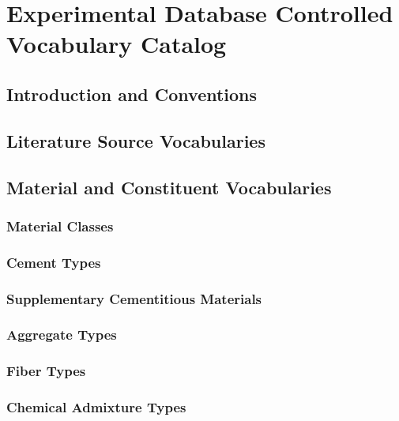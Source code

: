 
\chapter{Experimental Database Controlled Vocabulary Catalog}
\label{app:experimental-vocabularies}

\section{Introduction and Conventions}

\section{Literature Source Vocabularies}


\section{Material and Constituent Vocabularies}

\subsection{Material Classes}

\subsection{Cement Types}

\subsection{Supplementary Cementitious Materials}

\subsection{Aggregate Types}

\subsection{Fiber Types}

\subsection{Chemical Admixture Types}


